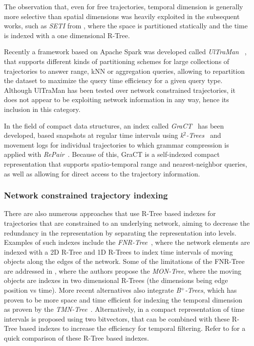\documentclass[runningheads]{llncs}
\begin{document}
The observation that, even for free trajectories, temporal dimension is generally more selective than spatial dimensions was heavily exploited in the subsequent works, such as {\em SETI} from \cite{chakka2003indexing}, where the space is partitioned statically and the time is indexed with a one dimensional R-Tree.

Recently a framework based on Apache Spark was developed called {\em UlTraMan}~ \cite{ding2018ultraman}, that supports different kinds of partitioning schemes for large collections of trajectories to answer range, kNN or aggregation queries, allowing to repartition the dataset to maximize the query time efficiency for a given query type. Although UlTraMan has been tested over network constrained trajectories, it does not appear to be exploiting network information in any way, hence its inclusion in this category.

In the field of compact data structures, an index called {\em GraCT}~\cite{brisaboa2019gract} has been developed, based snapshots at regular time intervals using {\em k$^2$-Trees}~\cite{brisaboa2009k} and movement logs for individual trajectories to which grammar compression is applied with {\em RePair}~\cite{larsson2000off}. Because of this, GraCT is a self-indexed compact representation that supports spatio-temporal range and nearest-neighbor queries, as well as allowing for direct access to the trajectory information.

\subsubsection{Network constrained trajectory indexing}
There are also numerous approaches that use R-Tree based indexes for trajectories that are constrained to an underlying network, aiming to decrease the redundancy in the representation by separating the representation into levels. Examples of such indexes include the {\em FNR-Tree}~\cite{DBLP:conf/ssd/Frentzos03}, where the network elements are indexed with a 2D R-Tree and 1D R-Trees to index time intervals of moving objects along the edges of the network. Some of the limitations of the FNR-Tree are addressed in \cite{DBLP:journals/geoinformatica/AlmeidaG05}, where the authors propose the {\em MON-Tree}, where the moving objects are indexes in two dimensional R-Trees (the dimensions being edge position vs time). More recent alternatives also integrate {\em B$^+$-Trees}, which has proven to be more space and time efficient for indexing the temporal dimension as proven by the {\em TMN-Tree}~\cite{chang2010tmn}. Alternatively, in \cite{rivera2018faster} a compact representation of time intervals is proposed using two bitvectors, that can be combined with these R-Tree based indexes to increase the efficiency for temporal filtering. Refer to \cite{john2017performance} for a quick comparison of these R-Tree based indexes.
\end{document}
